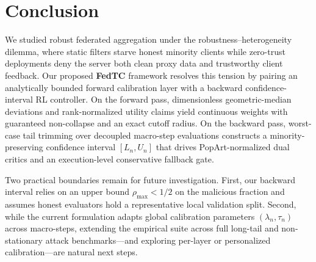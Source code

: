 \section{Conclusion}
\label{sec:conclusion}

We studied robust federated aggregation under the robustness--heterogeneity dilemma, where static filters starve honest minority clients while zero-trust deployments deny the server both clean proxy data and trustworthy client feedback. Our proposed \textbf{FedTC} framework resolves this tension by pairing an analytically bounded forward calibration layer with a backward confidence-interval RL controller. On the forward pass, dimensionless geometric-median deviations and rank-normalized utility claims yield continuous weights with guaranteed non-collapse and an exact cutoff radius. On the backward pass, worst-case tail trimming over decoupled macro-step evaluations constructs a minority-preserving confidence interval $[L_n, U_n]$ that drives PopArt-normalized dual critics and an execution-level conservative fallback gate.

Two practical boundaries remain for future investigation. First, our backward interval relies on an upper bound $\rho_{\max} < 1/2$ on the malicious fraction and assumes honest evaluators hold a representative local validation split. Second, while the current formulation adapts global calibration parameters $(\lambda_n, \tau_n)$ across macro-steps, extending the empirical suite across full long-tail and non-stationary attack benchmarks---and exploring per-layer or personalized calibration---are natural next steps.
